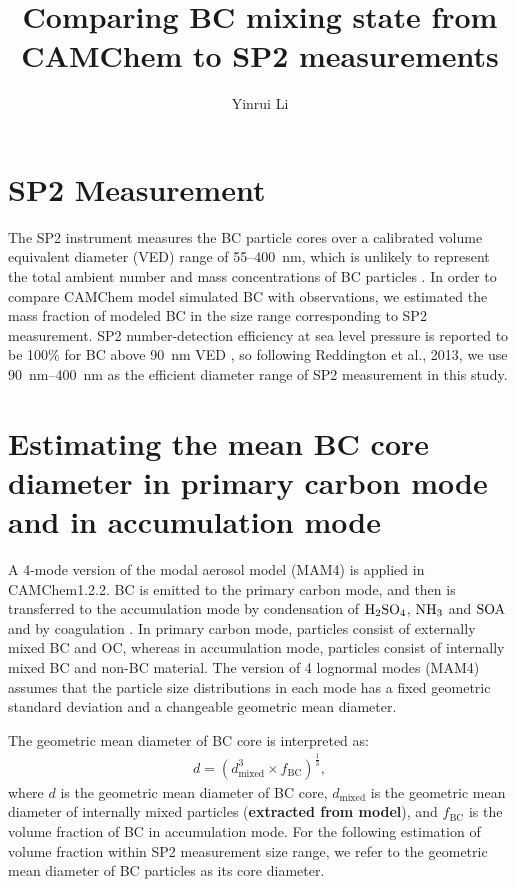 \documentclass[11pt]{article}
\title{\textbf{Comparing BC mixing state from CAMChem to SP2 measurements}}
\author{Yinrui Li}
\date{}
\begin{document}
	\maketitle
	
	
	
	\section{SP2 Measurement} 
	
	The SP2 instrument measures the BC particle cores over a calibrated volume equivalent diameter (VED) range of 55--400~nm, which is unlikely to represent the total
	ambient number and mass concentrations of BC particles \citep{Reddington2013}. In order to compare CAMChem model simulated BC with observations, we estimated the mass fraction of modeled BC in the size range corresponding to SP2 measurement. SP2 number-detection efficiency at sea level pressure is reported to be 100$\%$ for BC above 90~nm VED \citep{Schwarz2010a}, so following Reddington et al., 2013, we use 90~nm--400~nm as the efficient diameter range of SP2 measurement in this study.

	\section{Estimating the mean BC core diameter in primary carbon mode and in accumulation mode} 
	
	A 4-mode version of the modal aerosol model (MAM4) is applied in
	CAMChem1.2.2. BC is emitted to the primary carbon mode, and then is
	transferred to the accumulation mode by condensation of
	$\rm{H_2SO_4}$, $\rm{NH_3}$ and $\rm{SOA}$ and by coagulation \citep{Liu2012}. In primary carbon mode, particles consist of externally
	mixed BC and OC, whereas in accumulation mode, particles consist of
	internally mixed BC and non-BC material. The version of 4 lognormal modes (MAM4) assumes that the particle size distributions in each mode has a fixed geometric standard deviation and a changeable geometric mean diameter.
	
	
	The geometric mean diameter of BC core is interpreted as:
	\begin{align*}
	d = (d_{\text{mixed}}^3 \times f_{\text{BC}})^\frac{1}{3}, 
	\end{align*}
	where $d$ is the geometric mean diameter of BC core,
	$d_{\text{mixed}}$ is the geometric mean diameter of internally mixed particles
	(\textbf{extracted from model}), and $f_{\text{BC}}$ is the volume
	fraction of BC in accumulation mode. For the following estimation of volume fraction within SP2 measurement size range, we refer to the geometric mean diameter of BC particles as its core diameter.
	
\end{document}
